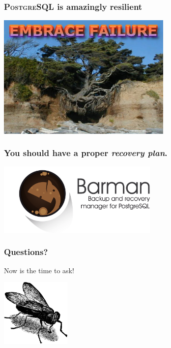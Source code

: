 \documentclass{beamer}
\begin{document}
\begin{frame}
  \frametitle{\textsc{PostgreSQL} is amazingly resilient}

  \begin{center}
    \includegraphics[height=2.4in]{resilience_logo.jpg}
  \end{center}
\end{frame}

\begin{frame}
  \frametitle{You should have a proper \textit{recovery plan}.}

  
  \begin{center}
    \includegraphics[height=1.4in]{pgbarman.png}
  \end{center}
\end{frame}

\begin{frame}
  \frametitle{Questions?}

\begin{center}
  Now is the time to ask!
  \vfill

  \includegraphics[height=9em]{fly.png}
\end{center}
\end{frame}
\end{document}
